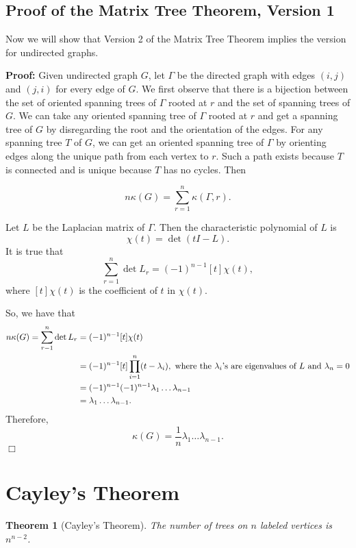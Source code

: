 \documentclass[11pt]{article}
\newtheorem{theorem}{Theorem}
\newenvironment{proof}{\noindent \textbf{Proof:}}{$\Box$}
\begin{document}
\subsection{Proof of the Matrix Tree Theorem, Version 1}

Now we will show that Version 2 of the Matrix Tree Theorem implies the version for undirected graphs.

\begin{proof}
Given undirected graph $G$, let $\Gamma$ be the directed graph with edges $(i,j)$ and $(j,i)$ for every edge of $G$.  We first observe that there is a bijection between the set of oriented spanning trees of $\Gamma$ rooted at $r$ and the set of spanning trees of $G$.  We can take any oriented spanning tree of $\Gamma$ rooted at $r$ and get a spanning tree of $G$ by disregarding the root and the orientation of the edges.  For any spanning tree $T$ of $G$, we can get an oriented spanning tree of $\Gamma$ by orienting edges along the unique path from each vertex to $r$.  Such a path exists because $T$ is connected and is unique because $T$ has no cycles.  Then

$$n\kappa(G) = \sum_{r=1}^n \kappa(\Gamma,r).$$

Let $L$ be the Laplacian matrix of $\Gamma$.  Then the characteristic polynomial of $L$ is
$$\chi(t) = \det{(tI - L)}.$$
It is true that
$$\sum_{r=1}^n \det{L_r} = (-1)^{n-1} [t] \chi(t),$$
where $[t] \chi(t)$ is the coefficient of $t$ in $\chi(t)$.

So, we have that
$$
\begin{aligned}
n \kappa(G) = \sum_{r-1}^n \det{L_r} &= (-1)^{n-1} [t] \chi(t) \\
&= (-1)^{n-1} [t] \prod_{i=1}^n(t-\lambda_i), \textup{  where the $\lambda_i$'s are eigenvalues of $L$ and $\lambda_n=0$} \\
&= (-1)^{n-1} (-1)^{n-1} \lambda_1 \ldots \lambda_{n-1} \\
&= \lambda_1 \ldots \lambda_{n-1}.
\end{aligned}
$$
Therefore,
$$ \kappa(G) = \frac{1}{n} \lambda_1 \ldots \lambda_{n-1}.$$
\end{proof}

\section{Cayley's Theorem}

\begin{theorem}[Cayley's Theorem]
The number of trees on $n$ labeled vertices is $n^{n-2}$.
\end{theorem}
\end{document}
